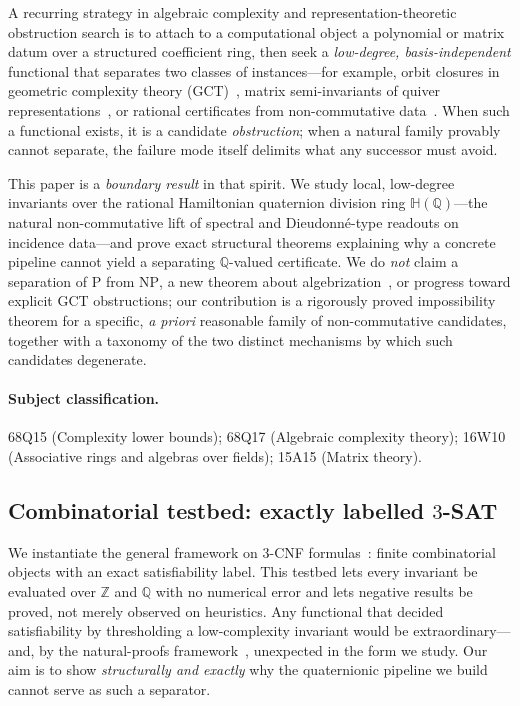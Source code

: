 \documentclass[pdflatex,sn-mathphys-num]{sn-jnl}
\theoremstyle{thmstyleone}%
\theoremstyle{thmstyletwo}%
\theoremstyle{thmstylethree}%
\newcommand{\HH}{\mathbb{H}}
\newcommand{\QQ}{\mathbb{Q}}
\newcommand{\ZZ}{\mathbb{Z}}
\begin{document}
A recurring strategy in algebraic complexity and representation-theoretic
obstruction search is to attach to a computational object a polynomial or
matrix datum over a structured coefficient ring, then seek a \emph{low-degree,
basis-independent} functional that separates two classes of instances---for
example, orbit closures in geometric complexity theory
(GCT)~\cite{GCT1,GCT2,MulmuleyCACM}, matrix semi-invariants of quiver
representations~\cite{DerksenMakam}, or rational certificates from
non-commutative data~\cite{GGOV,IvanyosQiaoSubrahmanyam}. When such a
functional exists, it is a candidate \emph{obstruction}; when a natural
family provably cannot separate, the failure mode itself delimits what any
successor must avoid.

This paper is a \emph{boundary result} in that spirit. We study local,
low-degree invariants over the rational Hamiltonian quaternion division ring
$\HH(\QQ)$---the natural non-commutative lift of spectral and Dieudonn\'e-type
readouts on incidence data---and prove exact structural theorems explaining
why a concrete pipeline cannot yield a separating $\QQ$-valued certificate.
We do \emph{not} claim a separation of $\mathrm{P}$ from $\mathrm{NP}$, a
new theorem about algebrization~\cite{AW}, or progress toward explicit GCT
obstructions; our contribution is a rigorously proved impossibility theorem
for a specific, \emph{a priori} reasonable family of non-commutative
candidates, together with a taxonomy of the two distinct mechanisms by which
such candidates degenerate.

\paragraph{Subject classification.}
68Q15 (Complexity lower bounds); 68Q17 (Algebraic complexity theory);
16W10 (Associative rings and algebras over fields); 15A15 (Matrix theory).

\subsection{Combinatorial testbed: exactly labelled \texorpdfstring{$3$-SAT}{3-SAT}}

We instantiate the general framework on $3$-CNF
formulas~\cite{Cook,GareyJohnson}: finite combinatorial objects with an exact
satisfiability label. This testbed lets every invariant be evaluated over
$\ZZ$ and $\QQ$ with no numerical error and lets negative results be proved,
not merely observed on heuristics. Any functional that decided satisfiability
by thresholding a low-complexity invariant would be extraordinary---and, by
the natural-proofs framework~\cite{RR}, unexpected in the form we study. Our
aim is to show \emph{structurally and exactly} why the quaternionic pipeline
we build cannot serve as such a separator.
\end{document}
